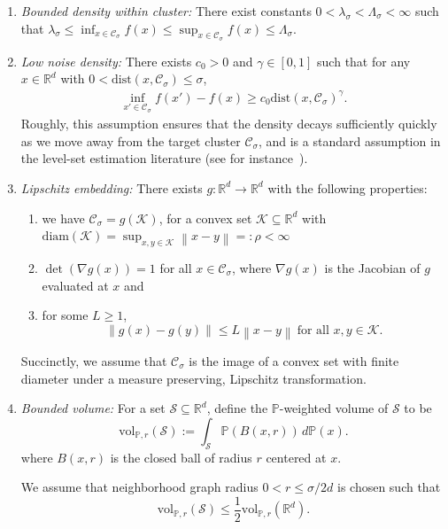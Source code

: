 \documentclass[11pt,twoside]{article}
\newcommand{\diam}{\rho}
\newcommand{\vol}{\mathrm{vol}}
\newcommand{\Reals}{\mathbb{R}}
\newcommand{\Rd}{\Reals^d}
\newcommand{\norm}[1]{\left\lVert#1\right\rVert}
\newcommand{\1}{\mathbf{1}}
\newcommand{\dist}{\mathrm{dist}}
\newcommand{\Pbb}{\mathbb{P}}
\newcommand{\Cset}{\mathcal{C}}
\newcommand{\Csig}{\Cset_{\sigma}}
\begin{document}
\begin{enumerate}[label=(A\arabic*)]
\item
  \label{asmp: bounded_density}
  \emph{Bounded density within cluster:} There exist constants
  $0<\lambda_{\sigma}< \Lambda_{\sigma}<\infty$ such that 
  $\lambda_{\sigma} \leq \inf_{x \in \Csig} f(x) \leq \sup_{x \in \Csig} f(x)
  \leq \Lambda_{\sigma}$. 

    
\item 
  \label{asmp: low_noise_density}
  \emph{Low noise density:} There exists $c_0 > 0$ and $\gamma \in [0,1]$ such that for any $x \in \Rd$ with $0 < \dist(x, \Csig) \leq \sigma$,   
  \begin{align*}
  \inf_{x' \in \Csig} f(x') - f(x) \geq  c_0 \dist(x, \Csig)^{\gamma}. 
  \end{align*}
  Roughly, 
  this assumption ensures that the density decays sufficiently quickly as we move away from
  the target cluster $\Csig$, and is a standard assumption in the level-set estimation literature
  (see for instance~\cite{singh2009}).
  
\item
  \label{asmp: embedding}
  \emph{Lipschitz embedding:}
  There exists $g: \Reals^d \to \Reals^d$ with the following properties: 
  \begin{enumerate}
  \item we have $\Csig = g(\mathcal{K})$, for a convex set $\mathcal{K} \subseteq \Rd$
  with $\mathrm{diam}(\mathcal{K}) = \sup_{x,y \in \mathcal{K}}\norm{x - y} =:
  \diam < \infty$
  \item $\det(\nabla g (x)) = 1$ for all $x \in \Csig$, where
  $\nabla g(x)$ is the Jacobian of $g$ evaluated at $x$ and
  \item for some $L
  \geq 1$,   
  \begin{equation*}
    \norm{g(x) - g(y)} \leq L \norm{x - y} ~
    \text{for all $x,y \in \mathcal{K}$}. 
  \end{equation*}
  \end{enumerate}
  Succinctly, we assume that $\Csig$ is the image of a convex set with finite diameter 
  under a  measure preserving, Lipschitz transformation. 

\item
  \label{asmp: bounded_volume}
  \emph{Bounded volume:}
  For a set $\mathcal{S} \subseteq \Reals^d$, define the $\Pbb$-weighted volume of $\mathcal{S}$ to be
  \begin{equation}
  \label{eqn:volume}
  \vol_{\Pbb,r}(\mathcal{S}) := \int_{\mathcal{S}} \Pbb(B(x,r)) \,d\Pbb(x).
  \end{equation}
  where $B(x,r)$ is the closed ball of radius $r$ centered at $x$.
  
  We assume that neighborhood graph radius $0 < r \leq \sigma/2d$ is chosen such that
  \begin{equation*}
  \vol_{\Pbb,r}(\mathcal{S}) \leq \frac{1}{2}\vol_{\Pbb,r}(\Reals^d).
  \end{equation*}
 
\end{enumerate}
\end{document}
